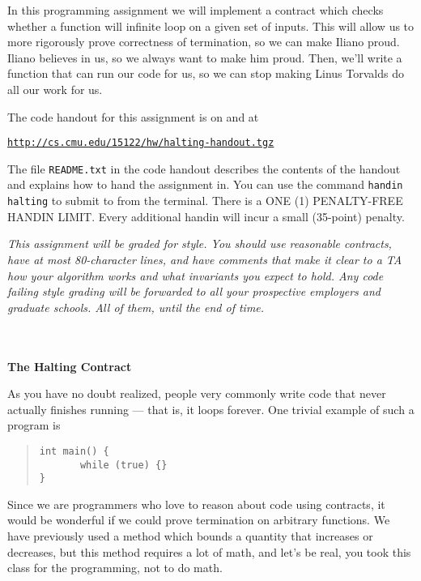 \documentclass[12pt]{exam}
\begin{document}
\hwTitle

\noindent
In this programming assignment we will implement a contract which checks whether a function will infinite loop on a given set of inputs. This will allow us to more rigorously prove correctness of termination, so we can make Iliano proud. Iliano believes in us, so we always want to make him proud. Then, we'll write a function that can run our code for us, so we can stop making Linus Torvalds do all our work for us.

\bigskip
\noindent
The code handout for this assignment is on \autolab{} and at
\begin{center}
\href{https://www.youtube.com/watch?v=dQw4w9WgXcQ}{\texttt{http://cs.cmu.edu/\texttildelow{}15122/hw/halting-handout.tgz}}
\end{center}
The file \lstinline'README.txt' in the code handout describes the contents of
the handout and explains how to hand the assignment in.  You can use the command \texttt{handin halting} to submit to \autolab{} from the terminal.  There is a ONE (1) PENALTY-FREE HANDIN LIMIT. Every additional handin will incur a small (35-point) penalty.

\begin{task}[0]
  \textit{This assignment will be graded for style. You should use reasonable contracts, have at most 80-character lines, and have comments that make it clear to a TA how your algorithm works and what invariants you expect to hold. Any code failing style grading will be forwarded to all your prospective employers and graduate schools. All of them, until the end of time.}
\end{task}
\\\\
\textbf{\large{The Halting Contract}}

As you have no doubt realized, people very commonly write code that never actually finishes running --- that is, it loops forever. One trivial example of such a program is
\begin{quote}
\begin{lstlisting}[language={[coin]C}]
int main() {
       while (true) {}
}
\end{lstlisting}
\end{quote}
Since we are programmers who love to reason about code using contracts, it would be wonderful if we could prove termination on arbitrary functions. We have previously used a method which bounds a quantity that increases or decreases, but this method requires a lot of math, and let's be real, you took this class for the programming, not to do math.
\end{document}
